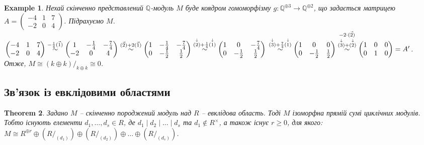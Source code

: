 \documentclass[a4paper, 10pt]{article}
\theoremstyle{theoremdd}
\newtheorem{theorem}{Theorem}[subsection]
\theoremstyle{theoremdd}
\theoremstyle{theoremdd}
\theoremstyle{theoremdd}
\theoremstyle{theoremdd}
\newtheorem{example}[theorem]{Example}
\theoremstyle{theoremdd}
\theoremstyle{theoremdd}
\theoremstyle{theoremdd}
\theoremstyle{theoremdd}
\theoremstyle{theoremdd}
\theoremstyle{theoremdd}
\theoremstyle{theoremdd}
\theoremstyle{theoremdd}
\theoremstyle{theoremdd}
\theoremstyle{theoremdd}
\begin{document}
\begin{example}
Нехай скінченно представлений $\mathbb{Q}$-модуль $M$ буде коядром гомоморфізму $g \colon \mathbb{Q}^{\oplus 3} \to \mathbb{Q}^{\oplus 2}$, що задається матрицею $A = \begin{pmatrix}
-4 & 1 & 7 \\
-2 & 0 & 4
\end{pmatrix}$. Підрахуємо $M$.\\
$\begin{pmatrix}
-4 & 1 & 7 \\
-2 & 0 & 4
\end{pmatrix} \overset{\substack{-\frac{1}{4} \vec{(1)}}}{\sim} \begin{pmatrix}
1 & -\frac{1}{4} & -\frac{7}{4} \\
-2 & 0 & 4
\end{pmatrix} \overset{\vec{(2)} + 2 \vec{(1)}}{\sim} \begin{pmatrix}
1 & -\frac{1}{4} & -\frac{7}{4} \\
0 & -\frac{1}{2} & \frac{1}{2}
\end{pmatrix} \overset{\substack{ \overset{\downarrow}{(2)} + \frac{1}{4}\overset{\downarrow}{(1)}}}{\sim} \begin{pmatrix}
1 & 0 & -\frac{7}{4} \\
0 & -\frac{1}{2} & \frac{1}{2}
\end{pmatrix} \\
\overset{\substack{\overset{\downarrow}{(3)} + \frac{7}{4} \overset{\downarrow}{(1)} }}{\sim} \begin{pmatrix}
1 & 0 & 0 \\
0 & -\frac{1}{2} & \frac{1}{2}
\end{pmatrix} \overset{\substack{\substack{-2 \cdot \vec{(2)} \\ \overset{\downarrow}{(3)} + \overset{\downarrow}{(2)}}}}{\sim} \begin{pmatrix}
1 & 0 & 0 \\
0 & 1 & 0
\end{pmatrix} = A'$.\\
Отже, $M \cong (k \oplus k)/_{k \oplus k} \cong 0$.
\end{example}

\subsection{Зв'язок із евклідовими областями}
\begin{theorem}
Задано $M$ -- скінченно породжений модуль над $R$ -- евклідова область. Тоді $M$ ізоморфна прямій сумі циклічних модулів. Тобто існують елементи $d_1,\dots,d_s \in R$, де $d_1 \mid d_2 \mid \dots \mid d_s$ та $d_1 \notin R^\times$, а також існує $r \geq 0$, для якого:\\
$M \cong R^{\oplus r} \oplus (R/_{(d_1)}) \oplus (R/_{(d_2)}) \oplus \dots \oplus (R/_{(d_s)})$.
\end{theorem}
\end{document}
